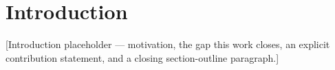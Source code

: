 \section{Introduction}
\label{sec:intro}
[Introduction placeholder — motivation, the gap this work closes, an explicit contribution statement,
and a closing section-outline paragraph.]

